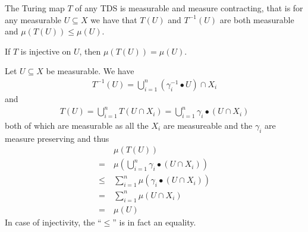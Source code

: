 \begin{Lemma} \label{tds:lemma_tx_measurable:lemma}
	The Turing map $T$ of any TDS is measurable and measure contracting, that is for any measurable $U \subseteq X$ we have that $T(U)$ and $T^{-1}(U)$ are both measurable and $\mu(T(U)) \leq \mu(U)$.

	If $T$ is injective on $U$, then $\mu(T(U)) = \mu(U)$.
\end{Lemma}
\proof
Let $U \subseteq X$ be measurable. We have
\begin{align*}
	T^{-1}(U) = \bigcup_{i=1}^n (\gamma_i^{-1} \bullet U) \cap X_i
\end{align*}
and
\begin{align*}
	T(U) = \bigcup_{i=1}^n T(U \cap X_i) = \bigcup_{i=1}^n \gamma_i \bullet (U \cap X_i)
\end{align*}
both of which are measurable as all the $X_i$ are measureable and the $\gamma_i$ are measure preserving and thus
\begin{align*}
	  &\mu(T(U)) \\
	=~&\mu(\bigcup_{i=1}^n \gamma_i \bullet (U \cap X_i)) \\
	\leq~&\sum_{i=1}^n \mu(\gamma_i \bullet (U \cap X_i)) \\
	=~&\sum_{i=1}^n \mu(U \cap X_i) \\
	=~&\mu(U)
\end{align*}
In case of injectivity, the ``$\leq$'' is in fact an equality.
\endproof
